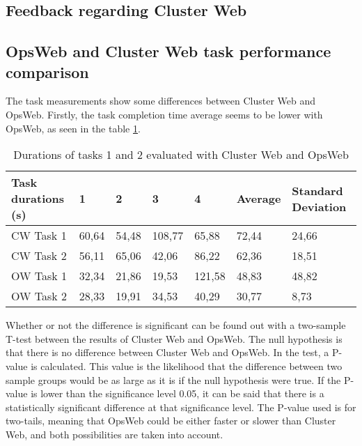 \subsection{Feedback regarding Cluster Web}

\subsection{OpsWeb and Cluster Web task performance comparison}
The task measurements show some differences between Cluster Web and OpsWeb. Firstly, the task completion time average seems to be lower with OpsWeb, as seen in the table \ref{cw_ow_times}.

\begin{table}[!ht]
\def\arraystretch{1.1}%
    \begin{center}
    \caption{Durations of tasks 1 and 2 evaluated with Cluster Web and OpsWeb}
    \label{cw_ow_times}
    \begin{tabular}{| l | l | l | l | l | l | l | }
    \hline
    Task durations (s) & 1     & 2     & 3      & 4      & Average & Standard Deviation \\
    \hline
    CW Task 1            & 60,64 & 54,48 & 108,77 & 65,88  & 72,44   & 24,66              \\
    CW Task 2            & 56,11 & 65,06 & 42,06  & 86,22  & 62,36   & 18,51              \\
    OW Task 1            & 32,34 & 21,86 & 19,53  & 121,58 & 48,83   & 48,82              \\
    OW Task 2            & 28,33 & 19,91 & 34,53  & 40,29  & 30,77   & 8,73              \\
    \hline
    \end{tabular}
    \end{center}
\end{table}

Whether or not the difference is significant can be found out with a two-sample T-test between the results of Cluster Web and OpsWeb. The null hypothesis is that there is no difference between Cluster Web and OpsWeb. In the test, a P-value is calculated. This value is the likelihood that the difference between two sample groups would be as large as it is if the null hypothesis were true. If the P-value is lower than the significance level 0.05, it can be said that there is a statistically significant difference at that significance level. The P-value used is for two-tails, meaning that OpsWeb could be either faster or slower than Cluster Web, and both possibilities are taken into account.


